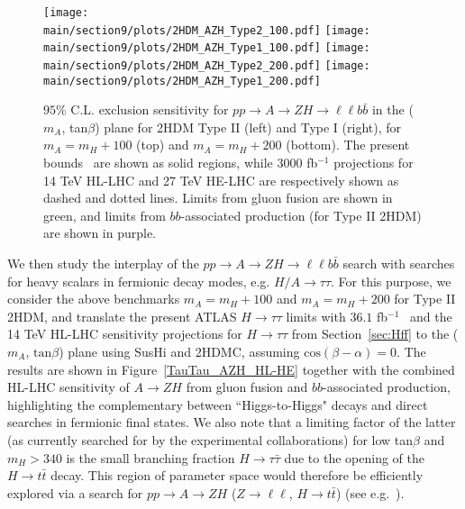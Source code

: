 \begin{figure}[h]
\begin{center}
\texttt{[image: \\main/section9/plots/2HDM\_AZH\_Type2\_100.pdf]}
\hspace{3mm}
\texttt{[image: \\main/section9/plots/2HDM\_AZH\_Type1\_100.pdf]}
\texttt{[image: \\main/section9/plots/2HDM\_AZH\_Type2\_200.pdf]}
\hspace{3mm}
\texttt{[image: \\main/section9/plots/2HDM\_AZH\_Type1\_200.pdf]}
\caption{\small $95\%$ C.L. exclusion sensitivity for $p p \to A \to Z H \to \ell\ell b \bar{b}$  
in the ($m_{A}$, tan$\beta$) plane for 2HDM Type II (left) and Type I (right), for $m_A = m_H +100$ \UGeV (top) and $m_A = m_H +200$ \UGeV (bottom). The present bounds~\cite{Aaboud:2018eoy} are shown as solid regions, while
$3000$ fb$^{-1}$ projections for 14 TeV HL-LHC and 27 TeV HE-LHC are respectively shown as dashed and dotted lines. Limits from gluon fusion are shown in green, and limits from $bb$-associated production (for Type II 2HDM) are shown in purple.}
\label{AZH_HL-LHC}
\end{center}
\end{figure}


We then study the interplay of the $p p \to A \to Z H \to \ell\ell b \bar{b}$ search with searches for heavy scalars in fermionic decay modes, e.g. $H/A \to \tau\tau$. For this purpose, we consider 
the above benchmarks $m_A = m_H + 100$ \UGeV and $m_A = m_H + 200$ \UGeV for Type II 2HDM, and translate the present ATLAS $H \to \tau\tau$ limits with $36.1$ fb$^{-1}$~\cite{Aaboud:2017sjh} and the 14 TeV HL-LHC sensitivity projections for $H \to \tau\tau$ from Section~\ref{sec:Hff} to the ($m_{A}$, $\mathrm{tan}\beta$) plane using {\sc SusHi} and {\sc 2HDMC}, assuming $\mathrm{cos}(\beta - \alpha) = 0$. The results are shown in Figure~\ref{TauTau_AZH_HL-HE} together with the combined HL-LHC sensitivity of $A \to Z H$ from gluon fusion and $bb$-associated production, highlighting the complementary between ``Higgs-to-Higgs" decays and direct searches in fermionic final states. We also note that a limiting factor of the latter (as currently searched for by the experimental collaborations) for low tan$\beta$ and $m_H > 340$ \UGeV is the small branching fraction $H \to \tau \bar{\tau}$ due to the opening of the $H \to t \bar{t}$ decay. This region of parameter space would therefore be efficiently explored via a search for $p p \to A \to Z H$ ($Z\to \ell\ell$, $H \to t\bar{t}$) (see e.g.~\cite{Dorsch:2016tab,Haisch:2018djm}).

